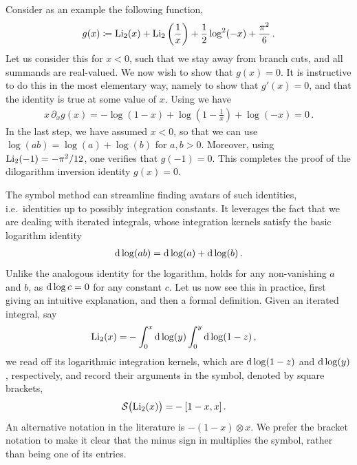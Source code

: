 Consider as an example the following function,
\begin{align}\label{defgexamplesymbol}
g(x) \coloneqq {\rm Li}_{2}(x) + {\rm Li}_{2}\left(\frac{1}{x}\right) + \frac{1}{2} \log^2(-x) + \frac{\pi^2}{6} \,. 
\end{align}
Let us consider this for $x<0$, such that we stay away from branch cuts, and all summands are real-valued.
We now wish to show that $g(x) =0$.
It is instructive to do this in the most elementary way, namely to show that $g'(x) =0$, and that the identity is true at some value of $x$.
Using  we have
\begin{align}
x \, \partial_x g(x) = - \log(1-x) + \log\left(1- \frac{1}{x} \right) + \log(-x)  = 0 \,.
\end{align}
In the last step, we have assumed $x<0$, so that we can use $\log(a b) = \log(a) + \log(b)$ for $a,b>0$.
Moreover, using ${\rm Li}_{2}(-1) = -\pi^2/12$, one verifies that $g(-1) = 0$. This completes the proof of the dilogarithm inversion identity $g(x)=0$.

The symbol method can streamline finding avatars of such identities, i.e.\ identities up to possibly integration constants.
It leverages the fact that we are dealing with iterated integrals, whose integration kernels satisfy the basic logarithm identity
\begin{align} \label{eq:dlogid}
\mathrm{d} \log(a b) = \mathrm{d} \log(a) + \mathrm{d} \log(b)\,.
\end{align}
Unlike the analogous identity for the logarithm,  holds for any non-vanishing $a$ and $b$, as $\mathrm{d} \log c = 0$ for any constant $c$.
Let us now see this in practice, first giving an intuitive explanation, and then a formal definition. Given an iterated integral, say 
\begin{align}
 {\rm Li}_{2}(x) 
 =&  -  \int_0^x \mathrm{d}\log(y) \int_0^y \mathrm{d}\log(1-z) \,, \label{Li2dlog} 
 \end{align}
we read off its logarithmic integration kernels, which are $\mathrm{d}\log(1-z)$ and $\mathrm{d}\log(y)$, respectively, and record their arguments in the symbol, denoted by square brackets,
 \begin{align}\label{eq:Li2symbolexample}
{\cal S} \bigl( {\rm Li}_{2}(x) \bigr) =& - [1-x,x] \,.
 \end{align}
 An alternative notation in the literature is $- (1-x) \otimes x$. We prefer the bracket notation to make it clear that the minus sign in  multiplies the symbol, rather than being one of its entries.
 
